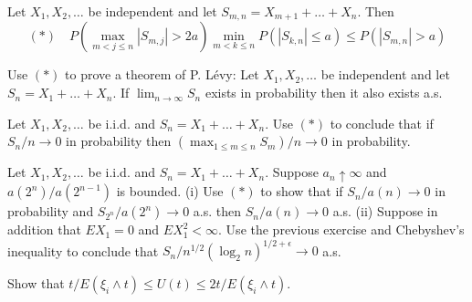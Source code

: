   \begin{exercise}[Durrett 2.5.9]
    Let $X_1, X_2, \dots$ be independent and let $S_{m, n} = X_{m+1} + \dots + X_n$. Then
    \begin{equation*}
      (*) \quad P\left( \max_{m < j \leq n} |S_{m, j}| > 2a \right) \min_{m < k \leq n} P(|S_{k, n}| \leq a) \leq P(|S_{m, n}| > a)
    \end{equation*}
  \end{exercise}
  \begin{solution}

  \end{solution}

  \begin{exercise}[Durrett 2.5.10]
    Use $(*)$ to prove a theorem of P. Lévy: Let $X_1, X_2, \dots$ be independent and let $S_n = X_1 + \dots + X_n$. If $\lim_{n \to \infty} S_n$ exists in probability then it also exists a.s.
  \end{exercise}
  \begin{solution}

  \end{solution}

  \begin{exercise}[Durrett 2.5.11]
    Let $X_1, X_2, \dots$ be i.i.d. and $S_n = X_1 + \dots + X_n$. Use $(*)$ to conclude that if $S_n/n \to 0$ in probability then $(\max_{1 \leq m \leq n} S_m)/n \to 0$ in probability.
  \end{exercise}
  \begin{solution}

  \end{solution}

  \begin{exercise}[Durrett 2.5.12]
    Let $X_1, X_2, \dots$ be i.i.d. and $S_n = X_1 + \dots + X_n$. Suppose $a_n \uparrow \infty$ and $a(2^n)/a(2^{n-1})$ is bounded. (i) Use $(*)$ to show that if $S_n/a(n) \to 0$ in probability and $S_{2^n}/a(2^n) \to 0$ a.s. then $S_n/a(n) \to 0$ a.s. (ii) Suppose in addition that $EX_1 = 0$ and $EX_1^2 < \infty$. Use the previous exercise and Chebyshev's inequality to conclude that $S_n/n^{1/2}(\log_2 n)^{1/2+\epsilon} \to 0$ a.s.
  \end{exercise}
  \begin{solution}

  \end{solution}

  \begin{exercise}[Durrett 2.6.1]
    Show that $t/E(\xi_i \wedge t) \leq U(t) \leq 2t/E(\xi_i \wedge t)$.
  \end{exercise}
  \begin{solution}

  \end{solution}

